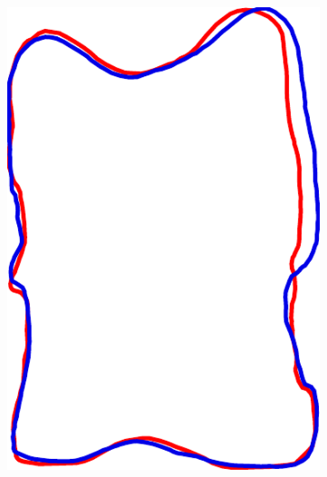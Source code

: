 \documentclass[pdftex,12pt,a4paper]{report}
\begin{document}
\begin{figure}[h]
\begin{subfigure}[b]{0.24\textwidth}
	\end{subfigure}
	\begin{subfigure}[b]{0.24\textwidth}
		\centering
		\includegraphics[width=.85\linewidth]{img/registration/single-procrustes.pdf}
	\end{subfigure}
	\begin{subfigure}[b]{0.24\textwidth}
		\centering

\end{subfigure}
\end{figure}
\end{document}
